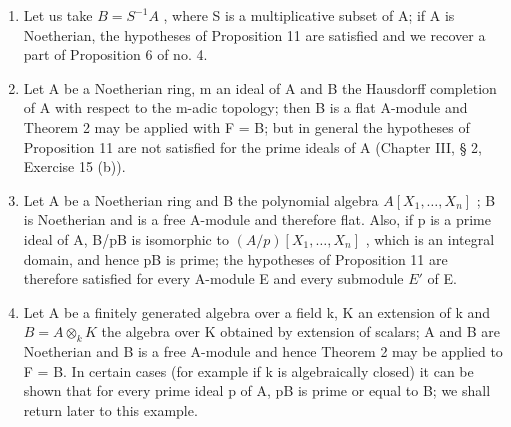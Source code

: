 \begin{enumerate}
\def\labelenumi{(\arabic{enumi})}
\item
  Let us take \(B = S^{-1}A\) , where S is a multiplicative subset of A; if A is Noetherian, the hypotheses of Proposition 11 are satisfied and we recover a part of Proposition 6 of no. 4.
\item
  Let A be a Noetherian ring, m an ideal of A and B the Hausdorff completion of A with respect to the m-adic topology; then B is a flat A-module and Theorem 2 may be applied with F = B; but in general the hypotheses of Proposition 11 are not satisfied for the prime ideals of A (Chapter III, § 2, Exercise 15 (b)).
\item
  Let A be a Noetherian ring and B the polynomial algebra \(A[X_{1},\ldots,X_{n}]\) ; B is Noetherian and is a free A-module and therefore flat. Also, if p is a prime ideal of A, B/pB is isomorphic to \((A/p)[X_{1},\ldots,X_{n}]\) , which is an integral domain, and hence pB is prime; the hypotheses of Proposition 11 are therefore satisfied for every A-module E and every submodule \(E'\) of E.
\item
  Let A be a finitely generated algebra over a field k, K an extension of k and \(B = A \otimes_{k} K\) the algebra over K obtained by extension of scalars; A and B are Noetherian and B is a free A-module and hence Theorem 2 may be applied to F = B. In certain cases (for example if k is algebraically closed) it can be shown that for every prime ideal p of A, pB is prime or equal to B; we shall return later to this example.
\end{enumerate}

